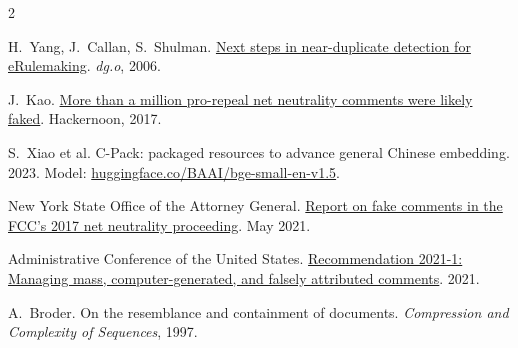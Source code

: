 \documentclass[10pt,twocolumn]{article}
\begin{document}
\begin{multicols}{2}
{\footnotesize
\begin{enumerate}[label={[\arabic*]},leftmargin=1.8em,labelsep=.4em,itemsep=2pt,parsep=0pt,topsep=0pt]
\item H.~Yang, J.~Callan, S.~Shulman. \href{https://www.cs.cmu.edu/~callan/Papers/dgo06-huiyang.pdf}{Next steps in near-duplicate detection for eRulemaking}. \emph{dg.o}, 2006.
\item J.~Kao. \href{https://hackernoon.com/more-than-a-million-pro-repeal-net-neutrality-comments-were-likely-faked-e9f0e3ed36a6}{More than a million pro-repeal net neutrality comments were likely faked}. Hackernoon, 2017.
\item S.~Xiao et al. C-Pack: packaged resources to advance general Chinese embedding. 2023. Model: \href{https://huggingface.co/BAAI/bge-small-en-v1.5}{huggingface.co/BAAI/bge-small-en-v1.5}.
\item New York State Office of the Attorney General. \href{https://ag.ny.gov/press-release/2021/attorney-general-james-issues-report-detailing-millions-fake-comments-revealing}{Report on fake comments in the FCC's 2017 net neutrality proceeding}. May 2021.
\item Administrative Conference of the United States. \href{https://www.acus.gov/research-projects/mass-computer-generated-and-fraudulent-comments}{Recommendation 2021-1: Managing mass, computer-generated, and falsely attributed comments}. 2021.
\item A.~Broder. On the resemblance and containment of documents. \emph{Compression and Complexity of Sequences}, 1997.
\end{enumerate}\par}

\end{multicols}
\end{document}
